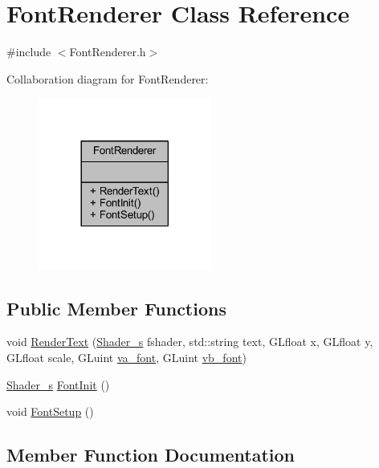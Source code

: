 \hypertarget{class_font_renderer}{}\section{Font\+Renderer Class Reference}
\label{class_font_renderer}


{\ttfamily \#include $<$Font\+Renderer.\+h$>$}



Collaboration diagram for Font\+Renderer\+:
\nopagebreak
\begin{figure}[H]
\begin{center}
\leavevmode
\includegraphics[width=161pt]{class_font_renderer__coll__graph}
\end{center}
\end{figure}
\subsection*{Public Member Functions}
\begin{DoxyCompactItemize}
\item 
void \mbox{\hyperlink{class_font_renderer_adaedb69de45aa987661d83539b0d4ed8}{Render\+Text}} (\mbox{\hyperlink{class_shader__s}{Shader\+\_\+s}} fshader, std\+::string text, G\+Lfloat x, G\+Lfloat y, G\+Lfloat scale, G\+Luint \mbox{\hyperlink{graphics_8cpp_ad111da7b6c832d91b7277bcc1af37b91}{va\+\_\+font}}, G\+Luint \mbox{\hyperlink{graphics_8cpp_a6f23896e3d54250f32e9be845a528e0c}{vb\+\_\+font}})
\item 
\mbox{\hyperlink{class_shader__s}{Shader\+\_\+s}} \mbox{\hyperlink{class_font_renderer_aa3830287fab6a8da56cde9c84aaf9032}{Font\+Init}} ()
\item 
void \mbox{\hyperlink{class_font_renderer_aa53dc1273b15862d310a4bc66817a5d5}{Font\+Setup}} ()
\end{DoxyCompactItemize}


\subsection{Member Function Documentation}
\mbox{\label{class_font_renderer_aa3830287fab6a8da56cde9c84aaf9032}} 
